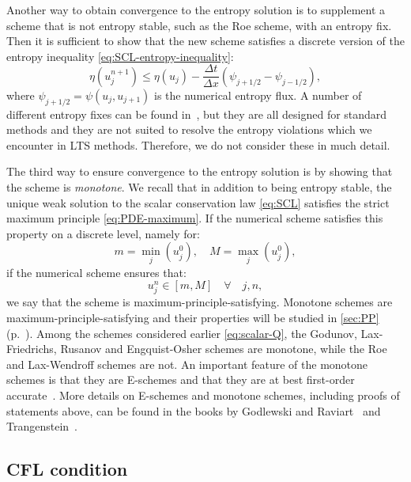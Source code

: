 Another way to obtain convergence to the entropy solution is to supplement a scheme that is not entropy stable, such as the Roe scheme, with an entropy fix. Then it is sufficient to show that the new scheme satisfies a discrete version of the entropy inequality \eqref{eq:SCL-entropy-inequality}:
\begin{equation}
\eta (u_j^{n+1}) \leq \eta (u_j) - \frac{\Delta t}{\Delta x}
\left( \psi_{j+1/2} - \psi_{j-1/2} \right),
\end{equation}
where $ \psi_{j+1/2} = \psi (u_{j}, u_{j+1})$ is the numerical entropy flux. A number of different entropy fixes can be found in~\cite{lev02}, but they are all designed for standard methods and they are not suited to resolve the entropy violations which we encounter in LTS methods. Therefore, we do not consider these in much detail. 

The third way to ensure convergence to the entropy solution is by showing that the scheme is \textit{monotone}. We recall that in addition to being entropy stable, the unique weak solution to the scalar conservation law \eqref{eq:SCL} satisfies the strict maximum principle \eqref{eq:PDE-maximum}. If the numerical scheme satisfies this property on a discrete level, namely for:
\begin{equation}
m = \underset{j}{\min} ( u_j^0 ), \quad M = \underset{j}{\max} ( u_j^0 ),
\end{equation}
if the numerical scheme ensures that:
\begin{equation} \label{eq:disrete-max}
u_j^n \in [m,M] \quad \forall \quad j,n,
\end{equation}
we say that the scheme is maximum-principle-satisfying. Monotone schemes are maximum-principle-satisfying and their properties will be studied in \cref{sec:PP} (p.~\pageref{def:MS}). Among the schemes considered earlier \eqref{eq:scalar-Q}, the Godunov, Lax-Friedrichs, Rusanov and Engquist-Osher schemes are monotone, while the Roe and Lax-Wendroff schemes are not. An important feature of the monotone schemes is that they are E-schemes and that they are at best first-order accurate~\cite{osh84}. More details on E-schemes and monotone schemes, including proofs of statements above, can be found in the books by Godlewski and Raviart~\cite{god96} and Trangenstein~\cite{tra09}.

\subsection{CFL condition}

